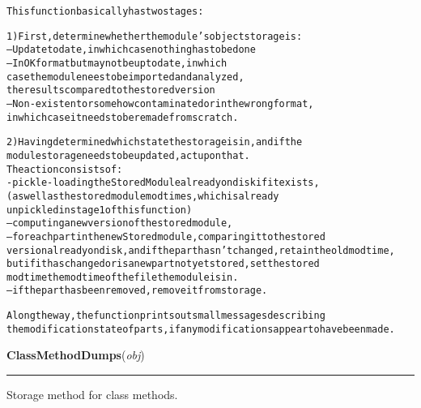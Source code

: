 \begin{boxedminipage}{\funcwidth}
\begin{alltt}
This function basically has two stages:

1) First, determine whether the module's object storage is:
        -- Update to date, in which case nothing has to be done
        -- In OK format but may not be up to date, in which
                case the module nees to be imported and analyzed, 
                the results compared to the stored version
        -- Non-existent or somehow contaminated or in the wrong format,
                in which case it needs to be remade from scratch.                               
                        
2) Having determined which state the storage is in, and if the 
module storage needs to be updated, act upon that.    
The action consists of:
        - pickle-loading the StoredModule already on disk if it exists, 
                (as well as the stored module mod times, which is already 
                unpickled in stage 1 of this function) 
        -- computing a new version of the stored module,
        -- for each part in the new Stored module, comparing it to the stored 
                version already on disk, and if the part hasn't changed, retain the old mod time,
                but if it has changed or is a new part not yet stored, set the stored 
                mod time the mod time of the file the module is in. 
                -- if the part has been removed, remove it from storage. 
                
Along the way, the function prints out small messages describing
the modification state of parts, if any modifications appear to have been made.                         
\end{alltt}

\setlength{\parskip}{1ex}
    \end{boxedminipage}

    \label{System:Storage:ClassMethodDumps}

    \vspace{0.5ex}

\hspace{.8\funcindent}\begin{boxedminipage}{\funcwidth}

    \raggedright \textbf{ClassMethodDumps}(\textit{obj})

    \vspace{-1.5ex}

    \rule{\textwidth}{0.5\fboxrule}
\setlength{\parskip}{2ex}
    Storage method for class methods.

\setlength{\parskip}{1ex}
    \end{boxedminipage}

